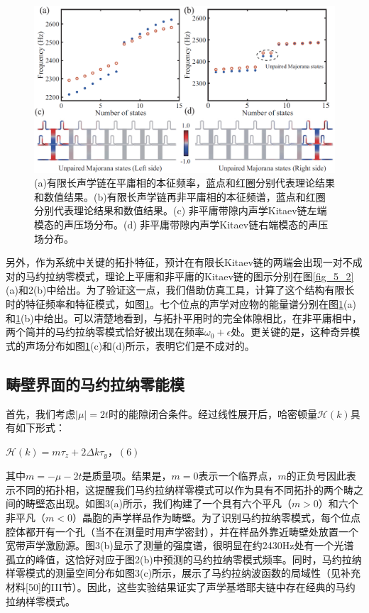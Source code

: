 \begin{figure}[h!]
    \centering
    \includegraphics[width=1\textwidth]{images/fig5-4.eps} 
    \caption{(a)有限长声学链在平庸相的本征频率，蓝点和红圈分别代表理论结果和数值结果。(b)有限长声学链再非平庸相的本征频谱，蓝点和红圈分别代表理论结果和数值结果。(c) 非平庸带隙内声学Kitaev链左端模态的声压场分布。(d) 非平庸带隙内声学Kitaev链右端模态的声压场分布。}
    \label{fig_5_4}
\end{figure}

另外，作为系统中关键的拓扑特征，预计在有限长Kitaev链的两端会出现一对不成对的马约拉纳零模式，理论上平庸和非平庸的Kitaev链的图示分别在图\ref{fig_5_2}(a)和2(b)中给出。为了验证这一点，我们借助仿真工具，计算了这个结构有限长时的特征频率和特征模式，如图\ref{fig_5_4}。七个位点的声学对应物的能量谱分别在图\ref{fig_5_4}(a)和\ref{fig_5_4}(b)中给出。可以清楚地看到，与拓扑平用时的完全体隙相比，在非平庸相中，两个简并的马约拉纳零模式恰好被出现在频率\(\omega_{0} + \epsilon\)处。更关键的是，这种奇异模式的声场分布如图\ref{fig_5_4}(c)和(d)所示，表明它们是不成对的。

\subsection{畴壁界面的马约拉纳零能模}

首先，我们考虑\(\vert \mu \vert = 2t\)时的能隙闭合条件。经过线性展开后，哈密顿量\(\mathcal{H}(k)\)具有如下形式：

\(\mathcal{H}(k) = m\tau_{z} + 2\Delta k\tau_{y}\)，\((6)\)

其中\(m = -\mu - 2t\)是质量项。结果是，\(m = 0\)表示一个临界点，\(m\)的正负号因此表示不同的拓扑相，这提醒我们马约拉纳样零模式可以作为具有不同拓扑的两个畴之间的畴壁态出现。如图3(a)所示，我们构建了一个具有六个平凡（\(m > 0\)）和六个非平凡（\(m < 0\)）晶胞的声学样品作为畴壁。为了识别马约拉纳零模式，每个位点腔体都开有一个孔（当不在测量时用声学密封），并在样品外靠近畴壁处放置一个宽带声学激励源。图3(b)显示了测量的强度谱，很明显在约2430Hz处有一个光谱孤立的峰值，这恰好对应于图2(b)中预测的马约拉纳零模式频率。同时，马约拉纳样零模式的测量空间分布如图3(c)所示，展示了马约拉纳波函数的局域性（见补充材料[50]的III节）。因此，这些实验结果证实了声学基塔耶夫链中存在经典的马约拉纳样零模式。


